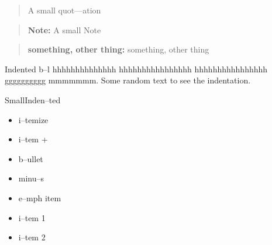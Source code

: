 \documentclass{book}
\newenvironment{Texinfoindented}{\begin{list}{}{}\item\relax}{\end{list}}
\renewcommand{\_}{\Texinfounderscore\discretionary{}{}{}}
\begin{document}
\begin{titlepage}
\begin{quote}
\begin{footnotesize}
A small quot---ation
\end{footnotesize}
\end{quote}

\begin{quote}
\begin{footnotesize}
\textbf{Note:} A small Note
\end{footnotesize}
\end{quote}

\begin{quote}
\begin{footnotesize}
\textbf{something, other thing:} something, other thing
\end{footnotesize}
\end{quote}

\begin{Texinfoindented}
Indented b--l hhhhhhhhhhhhhh hhhhhhhhhhhhhhhh hhhhhhhhhhhhhhhh gggggggggg
mmmmmmm.  Some random text to see the indentation.
\end{Texinfoindented}

\begin{Texinfoindented}
\begin{footnotesize}
SmallInden--ted
\end{footnotesize}
\end{Texinfoindented}

\begin{itemize}
\item i--temize
\end{itemize}

\begin{itemize}[label=+]
\item i--tem +
\end{itemize}

\begin{itemize}[label=\textbullet{}]
\item b--ullet
\end{itemize}

\begin{itemize}[label=-]
\item minu--s
\end{itemize}

\begin{itemize}[label=\emph{after emph}]
\item e--mph item
\end{itemize}

\begin{itemize}[label=\textbullet{} a--n itemize line]
\item {}%
i--tem 1
\item i--tem 2
\end{itemize}


\end{titlepage}
\end{document}
